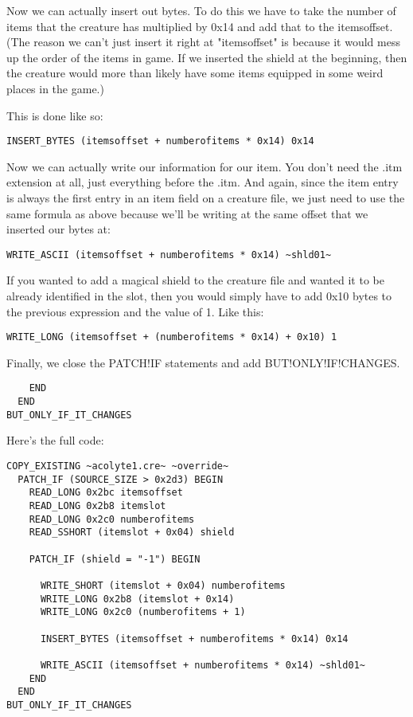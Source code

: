 \documentclass{article}
\def\ttref#1{\ahrefloc{#1}{\tt #1}}
\begin{document}
Now we can actually insert out bytes.  To do this we have to take the
number of items that the creature has multiplied by 0x14 and add that to
the itemsoffset.  (The reason we can't just insert it right at
"itemsoffset" is because it would mess up the order of the items in game.
If we inserted the shield at the beginning, then the creature would more
than likely have some items equipped in some weird places in the game.)

This is done like so:

\begin{verbatim}
INSERT_BYTES (itemsoffset + numberofitems * 0x14) 0x14
\end{verbatim}

Now we can actually write our information for our item.  You don't need the
.itm extension at all, just everything before the .itm.  And again, since
the item entry is always the first entry in an item field on a creature
file, we just need to use the same formula as above because we'll be
writing at the same offset that we inserted our bytes at:

\begin{verbatim}
WRITE_ASCII (itemsoffset + numberofitems * 0x14) ~shld01~
\end{verbatim}

If you wanted to add a magical shield to the creature file and wanted it to
be already identified in the slot, then you would simply have to add 0x10
bytes to the previous expression and \ttref{WRITE!LONG} the value of 1.
Like this:

\begin{verbatim}
WRITE_LONG (itemsoffset + (numberofitems * 0x14) + 0x10) 1
\end{verbatim}

Finally, we close the PATCH!IF statements and add BUT!ONLY!IF!CHANGES.

\begin{verbatim}
    END
  END
BUT_ONLY_IF_IT_CHANGES
\end{verbatim}

Here's the full code:

\begin{verbatim}
COPY_EXISTING ~acolyte1.cre~ ~override~
  PATCH_IF (SOURCE_SIZE > 0x2d3) BEGIN
    READ_LONG 0x2bc itemsoffset
    READ_LONG 0x2b8 itemslot
    READ_LONG 0x2c0 numberofitems
    READ_SSHORT (itemslot + 0x04) shield

    PATCH_IF (shield = "-1") BEGIN

      WRITE_SHORT (itemslot + 0x04) numberofitems
      WRITE_LONG 0x2b8 (itemslot + 0x14)
      WRITE_LONG 0x2c0 (numberofitems + 1)

      INSERT_BYTES (itemsoffset + numberofitems * 0x14) 0x14

      WRITE_ASCII (itemsoffset + numberofitems * 0x14) ~shld01~
    END
  END
BUT_ONLY_IF_IT_CHANGES
\end{verbatim}
\end{document}
